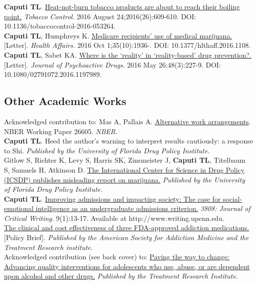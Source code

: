 \documentclass[11pt, letterpaper]{article}
\newcommand{\years}[1]{\marginnote{\normalsize #1}}
\begin{document}
\years{2016}\textbf{Caputi TL}.  \href{http://dx.doi.org/10.1136/tobaccocontrol-2016-053264}{Heat-not-burn tobacco products are about to reach their boiling point.} \textit{Tobacco Control}. 2016 August 24;2016(26):609-610. DOI: 10.1136/tobaccocontrol-2016-053264.\\[.2cm]
\years{2016}\textbf{Caputi TL}, Humphreys K. \href{http://dx.doi.org/10.1377/hlthaff.2016.1108}{Medicare recipients’ use of medical marijuana.} [Letter]. \textit{Health Affairs.} 2016 Oct 1;35(10):1936-. DOI: 10.1377/hlthaff.2016.1108.\\[.2cm]
\years{2016}\textbf{Caputi TL}, Sabet KA. \href{http://dx.doi.org/10.1080/02791072.2016.1197989}{Where is the ‘reality’ in ‘reality-based’ drug prevention?.} [Letter]. \textit{Journal of Psychoactive Drugs}. 2016 May 26;48(3):227-9. DOI: 10.1080/02791072.2016.1197989.\\[.2cm]


\subsection*{Other Academic Works}
\noindent
\years{2020}Acknowledged contribution to: Mas A, Pallais A. \href{https://www.nber.org/papers/w26605.pdf}{Alternative work arrangements}. NBER Working Paper 26605. \emph{NBER}.\\[.2cm]
\years{2017}\textbf{Caputi TL}. Heed the author’s warning to interpret results cautiously: a response to Shi. \emph{Published by the University of Florida Drug Policy Institute.}\\[.2cm]
\years{2015}Gitlow S, Richter K, Levy S, Harris SK, Zinsmeister J, \textbf{Caputi TL}, Titelbaum S, Samuels H, Atkinson D.  \href{https://www.academia.edu/16576576/The_International_Centre_for_Science_in_Drug_Policy_ICSDP_Publishes_Misleading_Report_on_Marijuana}{The International Center for Science in Drug Policy (ICSDP) publishes misleading report on marijuana.} \textit{Published by the University of Florida Drug Policy Institute}.\\ [.2cm]
\years{2015}\textbf{Caputi TL}. \href{http://www.writing.upenn.edu/critical/opportunities/3808/pdf/3808_fall_2015.pdf#page=13}{Improving admissions and impacting society: The case for social-emotional intelligence as an undergraduate admissions criterion.} \textit{3808: Journal of Critical Writing}. 9(1):13-17. Available at
http://www.writing.upenn.edu.\\[.2cm]
\years{2014}\href{https://web.archive.org/web/20170622171723/https://www.asam.org/docs/default-source/2015-conference-epk/asam-impact_cce-4-02-14.pdf?sfvrsn=4}{The clinical and cost effectiveness of three FDA-approved addiction medications.} [Policy Brief]. \textit{Published by the American Society for Addiction Medicine and the Treatment Research institute}. \\[.2cm]
\years{2014}Acknowledged contribution (see back cover) to: \href{https://issuu.com/tri_solutions/docs/tri_report_singlepages_highres}{Paving the way to change: Advancing quality interventions for adolescents who use, abuse, or are dependent upon alcohol and other drugs.} \textit{Published by the Treatment Research Institute}. \\[.2cm]
\end{document}
